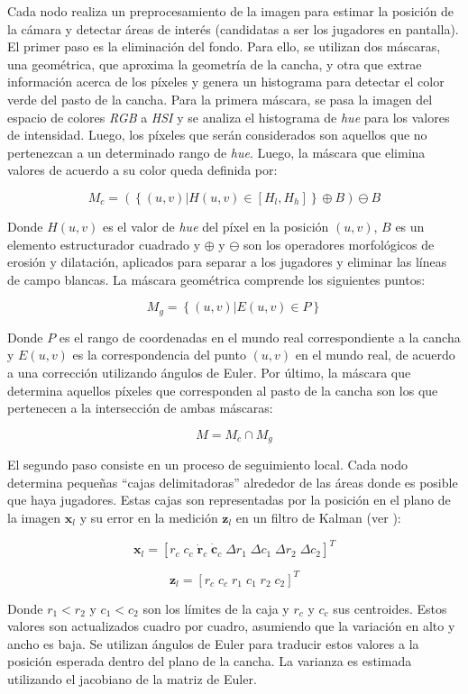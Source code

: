 \documentclass[a4paper,10pt]{article}
\begin{document}
Cada nodo realiza un preprocesamiento de la imagen para estimar la posición
de la cámara y detectar áreas de interés (candidatas a ser los jugadores en
pantalla). El primer paso es la eliminación del fondo. Para ello, se utilizan dos máscaras,
una geométrica, que aproxima la geometría de la cancha, y otra que extrae
información acerca de los píxeles y genera un histograma para detectar el color
verde del pasto de la cancha. Para la primera máscara, se pasa la imagen del
espacio de colores
\textit{RGB} a \textit{HSI} y se analiza el histograma de \textit{hue} para los
valores de intensidad. Luego, los píxeles que serán considerados son
aquellos que no pertenezcan a un determinado rango de \textit{hue}.
Luego, la máscara que elimina valores de acuerdo a su color queda definida por:

\[
  M_c = (\left\{(u, v) | H(u, v) \in [H_l, H_h]\right\} \oplus B ) \ominus B
\]

Donde $H(u, v)$ es el valor de \textit{hue} del píxel en la posición $(u, v)$,
$B$ es un elemento estructurador cuadrado y $\oplus$ y $\ominus$ son los
operadores morfológicos de erosión y dilatación, aplicados para separar a los
jugadores y eliminar las líneas de campo blancas. La máscara geométrica
comprende los siguientes puntos:

\[
  M_g = \left\{ (u, v) | E(u, v)  \in P \right\}
\]

Donde $P$ es el rango de coordenadas en el mundo real correspondiente a la cancha
y $E(u, v)$ es la correspondencia del punto $(u, v)$ en el mundo real, de
acuerdo a una corrección utilizando ángulos de Euler. Por último, la máscara que
determina aquellos píxeles que corresponden al pasto de la cancha son los que
pertenecen a la intersección de ambas máscaras:

\[
  M = M_c \cap M_g
\]

El segundo paso consiste en un proceso de seguimiento local. Cada nodo
determina pequeñas ``cajas delimitadoras'' alrededor de las áreas donde
es posible que haya jugadores. Estas cajas son
representadas por la posición en el plano de la imagen $\mathbf{x}_l$ y su
error en la medición $\mathbf{z}_l$ en un filtro de Kalman (ver \cite{funk2003study}):

\[
\mathbf{x}_l = [r_c \; c_c \;  \mathbf{\dot r}_c  \; \mathbf{\dot c}_c \;  \Delta r_1  \; \Delta c_1 \;  \Delta r_2 \;  \Delta c_2]^T
\]

\[
\mathbf{z}_l = [r_c \;  c_c  \; r_1  \; c_1  \; r_2  \; c_2]^T
\]

Donde $r_1 < r_2$ y $c_1 < c_2$ son los límites de la caja y
$r_c$ y $c_c$ sus centroides. Estos valores son
actualizados cuadro por cuadro, asumiendo que la variación en alto y ancho es
baja. Se utilizan ángulos de Euler para traducir estos valores a la posición
esperada dentro del plano de la cancha. La varianza es estimada utilizando el
jacobiano de la matriz de Euler.
\end{document}
